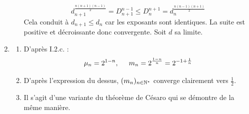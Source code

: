 \begin{enumerate}
\begin{enumerate}
\begin{displaymath}
 d_{n+1}^{\frac{n(n+1)(n-1)}{2}} = D_{n+1}^{n-1}  \leq D_{n}^{n+1} = d_n^{\frac{n(n-1)(n+1)}{2}}
\end{displaymath}
Cela conduit à $d_{n+1}\leq d_n$ car les exposants sont identiques. La suite est positive et décroissante donc convergente. Soit $d$ sa limite.
\end{enumerate}
\item 
\begin{enumerate}
 \item D'après I.2.c. :
\begin{displaymath}
 \mu_n = 2^{1-n}, \hspace{0.5cm} m_n = 2^{\frac{1-n}{n}}=2^{-1+\frac{1}{n}}
\end{displaymath}
\item D'après l'expression du dessus, $(m_n)_{n\in\mathbb{N}^*}$ converge clairement vers $\frac{1}{2}$.
\item Il s'agit d'une variante du théorème de Césaro qui se démontre de la même manière.
\end{enumerate}
 

\end{enumerate}
